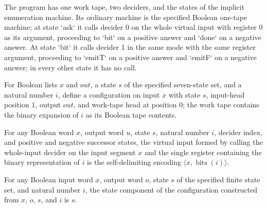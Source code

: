 \begin{definition}
\label{Complexity.ImplicitEnum.prog}
\leanok
{}
The program has one work tape, two deciders, and the states of the implicit enumeration
machine. Its ordinary machine is the specified Boolean one-tape machine; at state `ask`
it calls decider 0 on the whole virtual input with register 0 as its argument,
proceeding to `bit` on a positive answer and `done` on a negative answer. At state `bit`
it calls decider 1 in the same mode with the same register argument, proceeding to
`emitT` on a positive answer and `emitF` on a negative answer; in every other state it
has no call.
\end{definition}

\begin{definition}
\label{Complexity.ImplicitEnum.cfg}
\leanok
{}
For Boolean lists $x$ and $out$, a state $s$ of the specified seven-state set, and a
natural number $i$, define a configuration on input $x$ with state $s$, input-head
position $1$, output $out$, and work-tape head at position $0$; the work tape contains
the binary expansion of $i$ as its Boolean tape contents.
\end{definition}

\begin{lemma}
\label{Complexity.ImplicitEnum.vword_call}
\leanok
{}
For any Boolean word $x$, output word $u$, state $s$, natural number $i$, decider index,
and positive and negative successor states, the virtual input formed by calling the
whole-input decider on the input segment $x$ and the single register containing the
binary representation of $i$ is the self-delimiting encoding $\langle
x,\operatorname{bits}(i)\rangle$.
\end{lemma}

\begin{lemma}
\label{Complexity.ImplicitEnum.cfg_state}
\leanok
{}
For any Boolean input word $x$, output word $o$, state $s$ of the specified finite state
set, and natural number $i$, the state component of the configuration constructed from
$x$, $o$, $s$, and $i$ is $s$.
\end{lemma}

